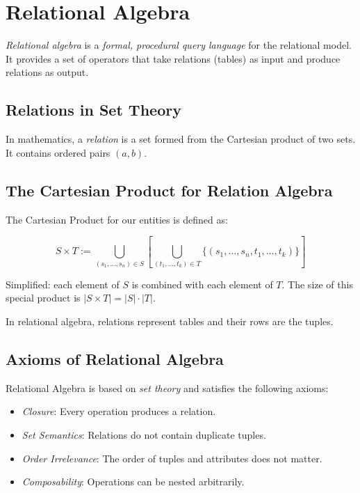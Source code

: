 \chapter{Relational Algebra}

\emph{Relational algebra} is a \emph{formal, procedural query language} for the relational model. It provides a set of operators that take relations (tables) as input and produce relations as output.

\section{Relations in Set Theory}

In mathematics, a \emph{relation} is a set formed from the Cartesian product of two sets. It contains ordered pairs \((a,b)\).

\section{The Cartesian Product for Relation Algebra}

The Cartesian Product for our entities is defined as:

\[
    S \times T := \bigcup_{(s_1, \dots, s_n) \in S} \left[ \bigcup_{(t_1, \dots, t_k) \in T} \{(s_1, \dots, s_n, t_1, \dots, t_k)\}\right]
\]

Simplified: each element of \(S\) is combined with each element of \(T\). The size of this
special product is \( |S \times T| = |S| \cdot |T| \).

In relational algebra, relations represent tables and their rows are the tuples.

\section{Axioms of Relational Algebra}

Relational Algebra is based on \emph{set theory} and satisfies the following axioms:

\begin{itemize}

    \item \emph{Closure}: Every operation produces a relation.

    \item \emph{Set Semantics}: Relations do not contain duplicate tuples.

    \item \emph{Order Irrelevance}: The order of tuples and attributes does not matter.

    \item \emph{Composability}: Operations can be nested arbitrarily.

\end{itemize}

